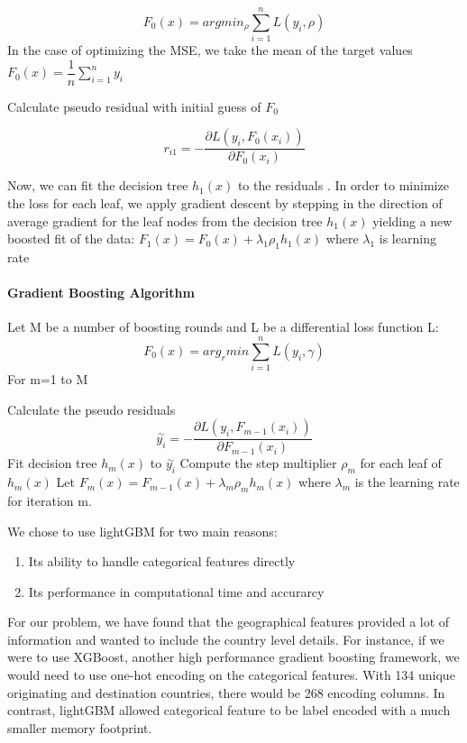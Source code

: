 \documentclass[]{article}
\providecommand{\tightlist}{%
  \setlength{\itemsep}{0pt}\setlength{\parskip}{0pt}}
\let\oldparagraph\paragraph
\renewcommand{\paragraph}[1]{\oldparagraph{#1}\mbox{}}
\begin{document}
\[
    F_0(x)=argmin_{\rho}\sum_{i=1}^nL(y_i,\rho)
\] In the case of optimizing the MSE, we take the mean of the target
values \(F_0(x)=\dfrac{1}{n}\sum_{i=1}^ny_i\)

Calculate pseudo residual with initial guess of \(F_0\)

\[
    r_{i1}=-\dfrac{\partial L(y_i,F_{0}(x_i))}{\partial F_{0}(x_i)}
\]

Now, we can fit the decision tree \(h_1(x)\) to the residuals . In order
to minimize the loss for each leaf, we apply gradient descent by
stepping in the direction of average gradient for the leaf nodes from
the decision tree \(h_1(x)\) yielding a new boosted fit of the data:
\(F_1(x)=F_{0}(x)+\lambda_1\rho_1h_1(x)\) where \(\lambda_1\) is
learning rate

\hypertarget{gradient-boosting-algorithm}{%
\paragraph{Gradient Boosting
Algorithm}\label{gradient-boosting-algorithm}}

Let M be a number of boosting rounds and L be a differential loss
function L: \[
    F_0(x)=arg_r min\sum_{i=1}^nL(y_i,\gamma)
\] For m=1 to M

Calculate the pseudo residuals \[
    \overset{\sim}{y_{i}}=-\dfrac{\partial L(y_i,F_{m-1}(x_i))}{\partial F_{m-1}(x_i)}
\] Fit decision tree \(h_m(x)\) to \(\overset{\sim}{y_{i}}\) Compute the
step multiplier \(\rho_m\) for each leaf of \(h_m(x)\) Let
\(F_m(x)=F_{m-1}(x)+\lambda_m\rho_mh_m(x)\) where \(\lambda_m\) is the
learning rate for iteration m.

We chose to use lightGBM for two main reasons:

\begin{enumerate}
\def\labelenumi{\arabic{enumi}.}
\tightlist
\item
  Its ability to handle categorical features directly
\item
  Its performance in computational time and accurarcy
\end{enumerate}

For our problem, we have found that the geographical features provided a
lot of information and wanted to include the country level details. For
instance, if we were to use XGBoost, another high performance gradient
boosting framework, we would need to use one-hot encoding on the
categorical features. With 134 unique originating and destination
countries, there would be 268 encoding columns. In contrast, lightGBM
allowed categorical feature to be label encoded with a much smaller
memory footprint.
\end{document}
